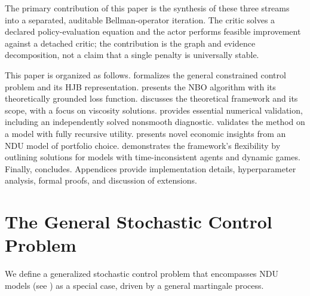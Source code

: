 \documentclass[ecta]{econsocart}
\theoremstyle{plain}
\theoremstyle{remark}
\begin{document}
The primary contribution of this paper is the synthesis of these three streams into a separated, auditable Bellman-operator iteration. The critic solves a declared policy-evaluation equation and the actor performs feasible improvement against a detached critic; the contribution is the graph and evidence decomposition, not a claim that a single penalty is universally stable.

This paper is organized as follows.  formalizes the general constrained control problem and its HJB representation.  presents the NBO algorithm with its theoretically grounded loss function.  discusses the theoretical framework and its scope, with a focus on viscosity solutions.  provides essential numerical validation, including an independently solved nonsmooth diagnostic.  validates the method on a model with fully recursive utility.  presents novel economic insights from an NDU model of portfolio choice.  demonstrates the framework's flexibility by outlining solutions for models with time-inconsistent agents and dynamic games. Finally,  concludes. Appendices provide implementation details, hyperparameter analysis, formal proofs, and discussion of extensions.

\section{The General Stochastic Control Problem}
\label{sec:problem_formulation}

We define a generalized stochastic control problem that encompasses NDU models (see \cite{qi2025}) as a special case, driven by a general martingale process.
\end{document}
